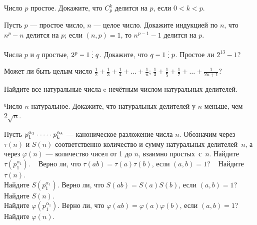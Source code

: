 \documentclass[a4paper,11pt]{article}
\newcommand{\del}{\mathrel{\raisebox{-.3 ex}{${\vdots}$}}}
\begin{document}
Число $p$ простое. Докажите, что $C_p^k$ делится на
$p$, если $0<k<p$.


Пусть $p$ --- простое число, $n$ --- целое число.
Докажите индукцией по $n$, что\\
  $n^p-n$ делится на $p$;
  если $(n,p)=1$, то $n^{p-1}-1$ делится на $p$.




Числа $p$ и $q$ простые, $2^{p}-1\del q$. Докажите,
что $q-1\del p$.
Простое ли $2^{13}-1$?


 Может ли быть целым число
$\displaystyle{\frac{1}{2}+\frac{1}{3}+\frac{1}{4}+\ldots+\frac{1}{n}}$;
$\displaystyle{\frac{1}{3}+\frac{1}{5}+\frac{1}{7}+\ldots+\frac{1}{2n+1}}$?




\vspace*{-1mm}

\vspace*{-2mm}
Найдите все натуральные числа c
неч\"етным числом натуральных делителей.

 Число $n$ натуральное. Докажите, что натуральных делителей
у $n$ меньше, чем $2\sqrt n$.

 Пусть $p_1^{\alpha_1}\cdot \dots \cdot p_k^{\alpha_k}$ ---
каноническое разложение числа $n$. Обозначим через $\tau(n)$ и $S(n)$ соответственно количество и сумму натуральных делителей~$n$, а
через $\varphi(n)$ --- количество чисел от 1 до $n$, взаимно простых~с~$n$.
 Найдите $\tau(p_1^{\alpha_1})$.  \ $\!\!\!$
 Верно ли, что $\tau(ab)=\tau(a)\tau(b)$, если $(a,b)=1$? \ $\!\!$
 Найдите $\tau(n)$.\\
 Найдите $S(p_1^{\alpha_1})$.
 Верно ли, что $S(ab)=S(a)S(b)$, если $(a,b)=1$?
 Найдите $S(n)$.\\
 Найдите $\varphi(p_1^{\alpha_1})$.
 Верно ли, что $\varphi(ab)=\varphi(a)\varphi(b)$, если $(a,b)=1$?
 Найдите $\varphi(n)$.
\end{document}
